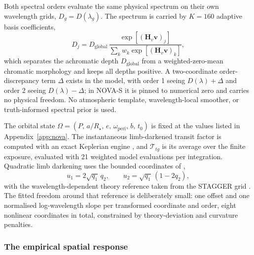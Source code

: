 
Both spectral orders evaluate the same physical spectrum on their own
wavelength grids, $D_g=D(\lambda_g)$. The spectrum is carried by $K=160$
adaptive basis coefficients,
\begin{equation}
  D_j = D_{\mathrm{global}}\,
  \frac{\exp\!\left[(\bm{H}_v\bm{v})_j\right]}
       {\sum_k w_k \exp\!\left[(\bm{H}_v\bm{v})_k\right]} ,
  \label{eq:depth-basis}
\end{equation}
which separates the achromatic depth $D_{\mathrm{global}}$ from a
weighted-zero-mean chromatic morphology and keeps all depths positive. A
two-coordinate order-discrepancy term $\Delta$ exists in the model, with
order 1 seeing $D(\lambda)+\Delta$ and order 2 seeing $D(\lambda)-\Delta$;
in NOVA-S it is pinned to numerical zero and carries no physical freedom.
No atmospheric template, wavelength-local smoother, or truth-informed
spectral prior is used.

The orbital state
$\Omega=(P,\,a/R_\star,\,e,\,\omega_{\mathrm{peri}},\,b,\,t_0)$ is fixed
at the values listed in Appendix~\ref{app:nova}. The instantaneous
limb-darkened transit factor is computed with an exact Keplerian engine
\citep{Jaxoplanet2025}, and $\mathcal{T}_{tg}$ is its average over the
finite exposure, evaluated with 21 weighted model evaluations per
integration. Quadratic limb darkening \citep{MandelAgol2002} uses the
bounded coordinates of \citet{Kipping2013},
\begin{equation}
 u_1=2\sqrt{q_1}\,q_2, \qquad
 u_2=\sqrt{q_1}\,(1-2q_2),
 \label{eq:kipping-coordinates}
\end{equation}
with the wavelength-dependent theory reference taken from the STAGGER
grid \citep{MagicEtAl2015}. The fitted freedom around that reference is
deliberately small: one offset and one normalised log-wavelength slope per
transformed coordinate and order, eight nonlinear coordinates in total,
constrained by theory-deviation and curvature penalties.

\subsubsection{The empirical spatial response}


